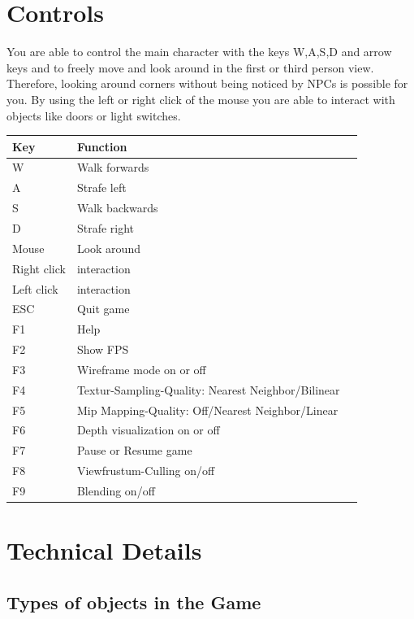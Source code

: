 \documentclass[12pt]{article}
\begin{document}
\section*{Controls}
You are able to control the main character with the keys W,A,S,D and arrow keys and to freely move and look around in the first or third person view.
Therefore, looking around corners without being noticed by NPCs is possible for you. By using the left or right click of the mouse you are able to interact with objects like doors or light switches.

\begin{table}[h!]
  \centering
  \label{table1}
  \begin{tabular}{p{2cm} | l l}
		\textbf{Key} & \textbf{Function}\\ \hline
		W & Walk forwards	\\
		A & Strafe left \\
		S & Walk backwards \\
		D & Strafe right \\

		Mouse & Look around\\
		Right click & interaction\\
		Left click & interaction\\

		 ESC & Quit game \\
		 F1 & Help \\
		 F2 & Show FPS \\
		 F3 & Wireframe mode on or off \\
		 F4 & Textur-Sampling-Quality: Nearest Neighbor/Bilinear\\
		 F5 & Mip Mapping-Quality: Off/Nearest Neighbor/Linear\\
		 F6 & Depth visualization on or off\\
		 F7 & Pause or Resume game \\
		 F8 & Viewfrustum-Culling on/off\\
		 F9 & Blending on/off\\
  \end{tabular}
\end{table}


\section*{Technical Details}
\subsection*{Types of objects in the Game}
\end{document}
